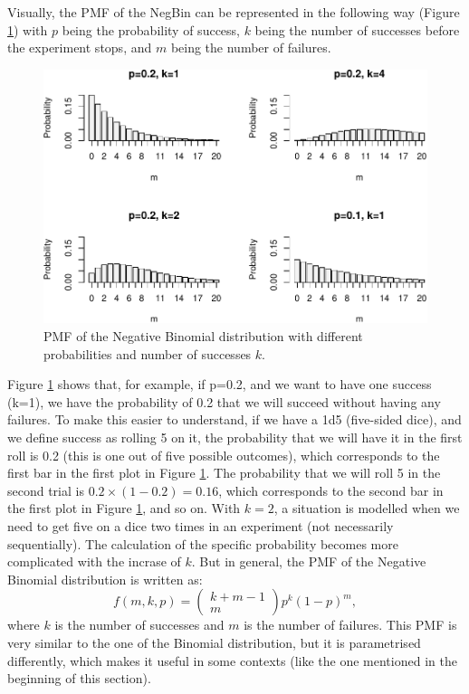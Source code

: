 \documentclass[
]{book}
\theoremstyle{definition}
\theoremstyle{definition}
\theoremstyle{definition}
\theoremstyle{definition}
\theoremstyle{remark}
\begin{document}
Visually, the PMF of the NegBin can be represented in the following way (Figure \ref{fig:NegBinPMF}) with \(p\) being the probability of success, \(k\) being the number of successes before the experiment stops, and \(m\) being the number of failures.

\begin{figure}
\centering
\includegraphics{Svetunkov---Statistics-for-Business-Analytics_files/figure-latex/NegBinPMF-1.pdf}
\caption{\label{fig:NegBinPMF}PMF of the Negative Binomial distribution with different probabilities and number of successes \(k\).}
\end{figure}

Figure \ref{fig:NegBinPMF} shows that, for example, if p=0.2, and we want to have one success (k=1), we have the probability of 0.2 that we will succeed without having any failures. To make this easier to understand, if we have a 1d5 (five-sided dice), and we define success as rolling 5 on it, the probability that we will have it in the first roll is 0.2 (this is one out of five possible outcomes), which corresponds to the first bar in the first plot in Figure \ref{fig:NegBinPMF}. The probability that we will roll 5 in the second trial is \(0.2 \times (1-0.2) = 0.16\), which corresponds to the second bar in the first plot in Figure \ref{fig:NegBinPMF}, and so on. With \(k=2\), a situation is modelled when we need to get five on a dice two times in an experiment (not necessarily sequentially). The calculation of the specific probability becomes more complicated with the incrase of \(k\). But in general, the PMF of the Negative Binomial distribution is written as:
\begin{equation}
    f(m, k, p) = \begin{pmatrix} k+m-1 \\ m \end{pmatrix} p^k (1-p)^m ,
    \label{eq:NegBinPMF}
\end{equation}
where \(k\) is the number of successes and \(m\) is the number of failures. This PMF is very similar to the one of the Binomial distribution, but it is parametrised differently, which makes it useful in some contexts (like the one mentioned in the beginning of this section).
\end{document}

